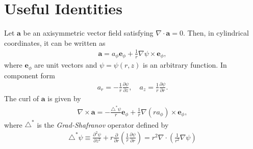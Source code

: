 \documentclass[11pt, reqno]{amsart}
\newcommand{\pfrac}[2]{\frac{\partial #1}{\partial #2}}
\newcommand{\mvec}[1]{\mathbf{#1}}
\newcommand{\eep}{\mvec{e}_\phi}
\theoremstyle{definition}
\begin{document}
\appendix

\section{Useful Identities}
\label{apdx:identities}

Let $\mvec{a}$ be an axisymmetric vector field satisfying
$\nabla\cdot\mvec{a} = 0$. Then, in cylindrical coordinates, it can be
written as
\begin{align}
  \mvec{a} = a_\phi \eep + \frac{1}{r}\nabla\psi \times \eep, \label{id:divA}
\end{align}
where $\eep$ are unit vectors and $\psi = \psi(r,z)$ is an arbitrary
function. In component form
\begin{align}
  a_r = -\frac{1}{r} \pfrac{\psi}{z}, \quad 
  a_z = \frac{1}{r} \pfrac{\psi}{r}.
\end{align}
The curl of $\mvec{a}$ is given by
\begin{align}
  \nabla\times\mvec{a} = -\frac{\triangle^*\psi}{r}\eep
  + \frac{1}{r} \nabla(ra_\phi)\times\eep, \label{eq:curla}
\end{align}
where $\triangle^*$ is the \emph{Grad-Shafranov} operator defined by
\begin{align}
  \triangle^*\psi \equiv \frac{\partial^2 \psi}{\partial z^2}
  + r \frac{\partial}{\partial r}
  \left(\frac{1}{r} \pfrac{\psi}{r}\right)
    =
  r^2\nabla\cdot\left(\frac{1}{r^2}\nabla\psi\right)
\end{align}
\end{document}

